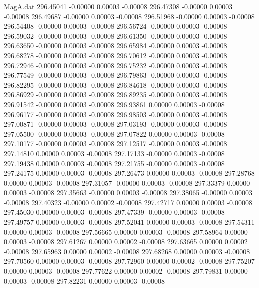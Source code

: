 \begin{filecontents}{MagA.dat}
 296.45041   -0.00000    0.00003   -0.00008
 296.47308   -0.00000    0.00003   -0.00008
 296.49687   -0.00000    0.00003   -0.00008
 296.51968   -0.00000    0.00003   -0.00008
 296.54408   -0.00000    0.00003   -0.00008
 296.56724   -0.00000    0.00003   -0.00008
 296.59032   -0.00000    0.00003   -0.00008
 296.61350   -0.00000    0.00003   -0.00008
 296.63650   -0.00000    0.00003   -0.00008
 296.65984   -0.00000    0.00003   -0.00008
 296.68278   -0.00000    0.00003   -0.00008
 296.70612   -0.00000    0.00003   -0.00008
 296.72946   -0.00000    0.00003   -0.00008
 296.75232   -0.00000    0.00003   -0.00008
 296.77549   -0.00000    0.00003   -0.00008
 296.79863   -0.00000    0.00003   -0.00008
 296.82295   -0.00000    0.00003   -0.00008
 296.84618   -0.00000    0.00003   -0.00008
 296.86929   -0.00000    0.00003   -0.00008
 296.89235   -0.00000    0.00003   -0.00008
 296.91542   -0.00000    0.00003   -0.00008
 296.93861    0.00000    0.00003   -0.00008
 296.96177   -0.00000    0.00003   -0.00008
 296.98503   -0.00000    0.00003   -0.00008
 297.00871   -0.00000    0.00003   -0.00008
 297.03193   -0.00000    0.00003   -0.00008
 297.05500   -0.00000    0.00003   -0.00008
 297.07822    0.00000    0.00003   -0.00008
 297.10177   -0.00000    0.00003   -0.00008
 297.12517   -0.00000    0.00003   -0.00008
 297.14810    0.00000    0.00003   -0.00008
 297.17133   -0.00000    0.00003   -0.00008
 297.19438    0.00000    0.00003   -0.00008
 297.21755   -0.00000    0.00003   -0.00008
 297.24175    0.00000    0.00003   -0.00008
 297.26473    0.00000    0.00003   -0.00008
 297.28768    0.00000    0.00003   -0.00008
 297.31057   -0.00000    0.00003   -0.00008
 297.33379    0.00000    0.00003   -0.00008
 297.35663   -0.00000    0.00003   -0.00008
 297.38065   -0.00000    0.00003   -0.00008
 297.40323   -0.00000    0.00002   -0.00008
 297.42717    0.00000    0.00003   -0.00008
 297.45030    0.00000    0.00003   -0.00008
 297.47339   -0.00000    0.00003   -0.00008
 297.49757    0.00000    0.00003   -0.00008
 297.52041    0.00000    0.00003   -0.00008
 297.54311    0.00000    0.00003   -0.00008
 297.56665    0.00000    0.00003   -0.00008
 297.58964    0.00000    0.00003   -0.00008
 297.61267    0.00000    0.00002   -0.00008
 297.63665    0.00000    0.00002   -0.00008
 297.65963    0.00000    0.00002   -0.00008
 297.68268    0.00000    0.00003   -0.00008
 297.70560    0.00000    0.00003   -0.00008
 297.72960    0.00000    0.00002   -0.00008
 297.75207    0.00000    0.00003   -0.00008
 297.77622    0.00000    0.00002   -0.00008
 297.79831    0.00000    0.00003   -0.00008
 297.82231    0.00000    0.00003   -0.00008

\end{filecontents}
